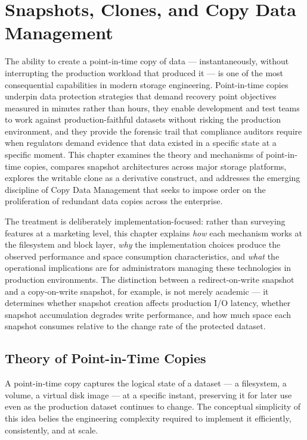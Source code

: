 \chapter{Snapshots, Clones, and Copy Data Management}
\label{ch:10}

The ability to create a point-in-time copy of data --- instantaneously, without interrupting the production workload that produced it --- is one of the most consequential capabilities in modern storage engineering. Point-in-time copies underpin data protection strategies that demand recovery point objectives measured in minutes rather than hours, they enable development and test teams to work against production-faithful datasets without risking the production environment, and they provide the forensic trail that compliance auditors require when regulators demand evidence that data existed in a specific state at a specific moment. This chapter examines the theory and mechanisms of point-in-time copies, compares snapshot architectures across major storage platforms, explores the writable clone as a derivative construct, and addresses the emerging discipline of Copy Data Management that seeks to impose order on the proliferation of redundant data copies across the enterprise.

The treatment is deliberately implementation-focused: rather than surveying features at a marketing level, this chapter explains \emph{how} each mechanism works at the filesystem and block layer, \emph{why} the implementation choices produce the observed performance and space consumption characteristics, and \emph{what} the operational implications are for administrators managing these technologies in production environments. The distinction between a redirect-on-write snapshot and a copy-on-write snapshot, for example, is not merely academic --- it determines whether snapshot creation affects production I/O latency, whether snapshot accumulation degrades write performance, and how much space each snapshot consumes relative to the change rate of the protected dataset.

\section{Theory of Point-in-Time Copies}

A point-in-time copy captures the logical state of a dataset --- a filesystem, a volume, a virtual disk image --- at a specific instant, preserving it for later use even as the production dataset continues to change. The conceptual simplicity of this idea belies the engineering complexity required to implement it efficiently, consistently, and at scale.

